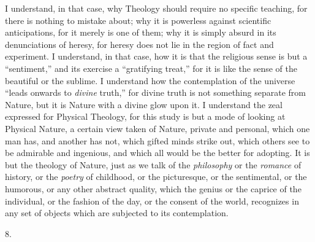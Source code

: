 I understand, in that case, why Theology should require no specific
teaching, for there is nothing to mistake about; why it is powerless
against scientific anticipations, for it merely is one of them; why it
is simply absurd in its denunciations of heresy, for heresy does not
lie in the region of fact and experiment. I understand, in that case,
how it is that the religious sense is but a ``sentiment,'' and
its exercise a ``gratifying treat,'' for it is like the sense
of the beautiful or the sublime. I understand how the contemplation of
the universe ``leads onwards to \emph{divine} truth,'' for
divine truth is not something separate from Nature, but it is Nature
with a divine glow upon it. I understand the zeal expressed for
Physical Theology, for this study is but a mode of looking at Physical
Nature, a certain view taken of Nature, private and personal, which
one man has, and another has not, which gifted minds strike out, which
others see to be admirable and ingenious, and which all would be the
better for adopting. It is but the theology of Nature, just as we talk
of the \emph{philosophy} or the \emph{romance} of history, or the \emph{poetry}
of childhood, or the picturesque, or the sentimental, or the humorous,
or any other abstract quality, which the genius or the caprice of the
individual, or the fashion of the day, or the consent of the world,
recognizes in any set of objects which are subjected to its
contemplation.

8.

